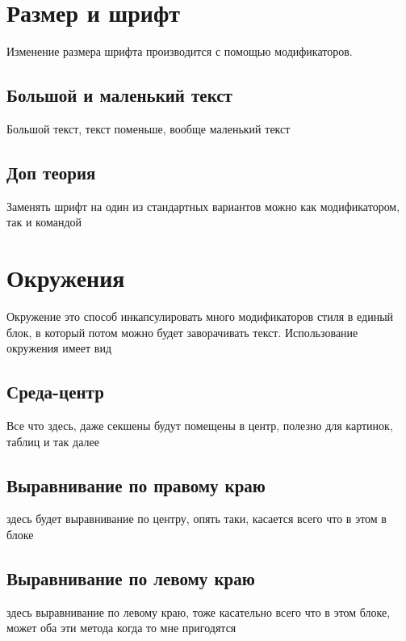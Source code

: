     
    \section{ \centering Размер и шрифт}
        Изменение размера шрифта производится с помощью модификаторов.
        
        \subsection{Большой и маленький текст}
        {\Large Большой текст}, текст поменьше, {\small вообще маленький текст}
        
        \subsection{Доп теория}
            Заменять шрифт на один из стандартных вариантов можно как модификатором, так и командой
    
    
    \section{Окружения}
        Окружение это способ инкапсулировать много модификаторов стиля в единый блок, в который
        потом можно будет заворачивать текст. Использование окружения имеет вид
        
        \subsection{Среда-центр}
            \begin{center}
                Все что здесь, даже секшены будут помещены в центр, полезно для картинок, таблиц и так далее
            \end{center}
        
        \subsection{Выравнивание по правому краю}
            \begin{flushright}
                здесь будет выравнивание по центру, опять таки, касается всего что в этом в блоке
            \end{flushright}
        
        \subsection{Выравнивание по левому краю}
            \begin{flushleft}
                здесь выравнивание по левому краю, тоже касательно всего что в этом блоке, может оба эти метода когда то мне пригодятся
            \end{flushleft}
    
